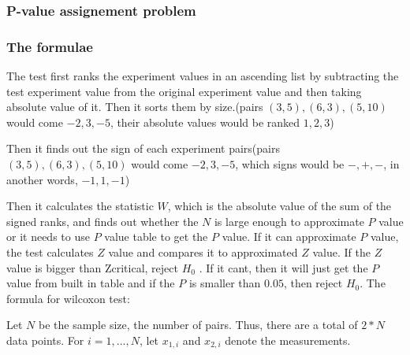 \documentclass[12pt]{article}
\begin{document}
\subsubsection{P-value assignement problem}


\subsubsection{The formulae}

The test first ranks the experiment values in an ascending list by subtracting the test experiment value from the original experiment value and then taking absolute value of it. Then it sorts them by size.(pairs $(3, 5), (6, 3), (5, 10)$ would come $-2, 3, -5$, their absolute values would be ranked $1, 2, 3$)

Then it finds out the sign of each experiment pairs(pairs $(3, 5), (6, 3), (5, 10)$ would come $-2, 3, -5$, which signs would be $-, +, -$, in another words, $-1, 1, -1$)

Then it calculates the statistic $W$, which is the absolute value of the sum of the signed ranks, and finds out whether the $N$ is large enough to approximate $P$ value or it needs to use $P$ value table to get the $P$ value. If it can approximate $P$ value, the test calculates $Z$ value and compares it to approximated $Z$ value. If the $Z$ value is bigger than Zcritical, reject $H_0$ . If it cant, then it will just get the $P$ value from built in table and if the $P$ is smaller than $0.05$, then reject $H_0$. The formula for wilcoxon test:

Let $N$ be the sample size, the number of pairs. Thus, there are a total of $2*N$ data points. For $i=1,...,N$, let $x_{1, i}$ and $x_{2, i}$ denote the measurements.
\end{document}

